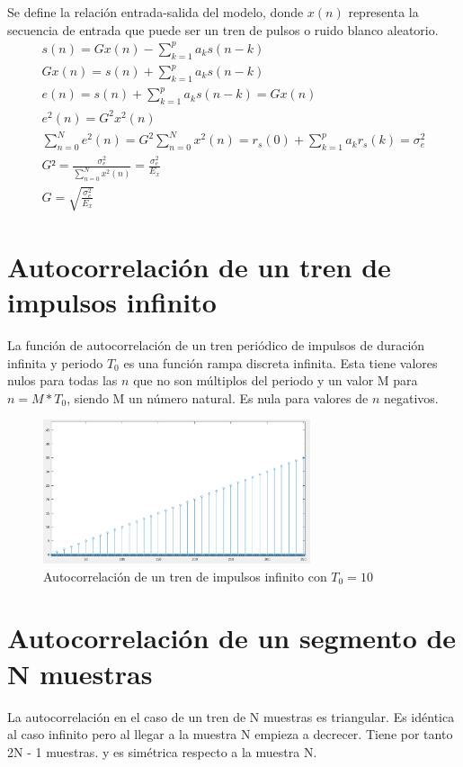 \documentclass[12pt]{article}
\begin{document}
Se define la relación entrada-salida del modelo, donde $x(n)$ representa la secuencia de entrada que puede ser un tren de pulsos o ruido blanco aleatorio.
\begin{gather*}
	s(n)=Gx(n) - \sum_{k=1}^{p}a_k s(n-k)\\
	Gx(n)=s(n) + \sum_{k=1}^{p}a_k s(n-k)\\
	e(n)= s(n) + \sum_{k=1}^{p}a_k s(n-k) = Gx(n)\\
	e^2(n)= G^2x^2(n)\\
	\sum_{n=0}^{N} e^2(n) =  G^2 \sum_{n=0}^{N}x^2(n) = r_s(0) + \sum_{k=1}^{p} a_k r_s(k) = \sigma_e^2\\
	G² = \frac{\sigma_e^2}{\sum_{n=0}^{N}x^2(n)} = \frac{\sigma_e^2}{E_x}\\
	G = \sqrt{\frac{\sigma_e^2}{E_x}}
\end{gather*}





\section{Autocorrelación de un tren de impulsos infinito}
La función de autocorrelación de un tren periódico de impulsos de duración infinita y periodo $T_0$ es una función rampa discreta infinita. Esta tiene valores nulos para todas las $n$ que no son múltiplos del periodo y un valor M para $n = M*T_0$, siendo M un número natural. Es nula para valores de $n$ negativos.

\begin{figure}[H]
	\centering
	\includegraphics[width=0.7\textwidth]{autocorr_tren_infinito.png}
	\caption{Autocorrelación de un tren de impulsos infinito con $T_0 = 10$}
\end{figure}


\section{Autocorrelación de un segmento de N muestras}
La autocorrelación en el caso de un tren de N muestras es triangular. Es idéntica al caso infinito pero al llegar a la muestra N empieza a decrecer. Tiene por tanto 2N - 1 muestras. y es simétrica respecto a la muestra N.
\end{document}
